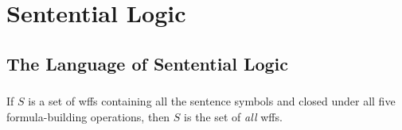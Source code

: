 \documentclass{report}
\begin{document}
\chapter{Sentential Logic}%

\section{The Language of Sentential Logic}%

\subsection{}%

  \begin{theorem}
    If $S$ is a set of wffs containing all the sentence symbols and closed under
      all five formula-building operations, then $S$ is the set of \textit{all}
      wffs.
  \end{theorem}
\end{document}
